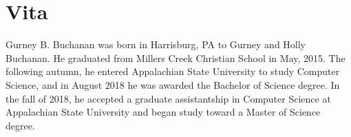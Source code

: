 \chapter*{\centering Vita}

Gurney B. Buchanan was born in Harrisburg, PA to Gurney and Holly Buchanan.  He graduated from Millers Creek Christian School in May, 2015.  The following autumn, he entered Appalachian State University to study Computer Science, and in August 2018 he was awarded the Bachelor of Science degree.  In the fall of 2018, he accepted a graduate assistantship in Computer Science at Appalachian State University and began study toward a Master of Science degree.
